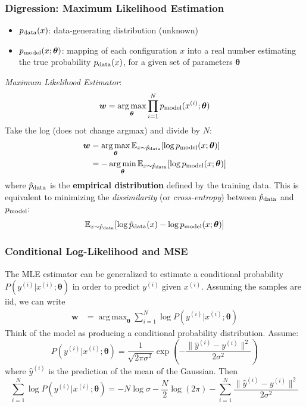 \documentclass{beamer}
\DeclareMathOperator*{\argmax}{arg\,max}
\DeclareMathOperator*{\argmin}{arg\,min}
\begin{document}
		\begin{frame}
		\frametitle{Digression: Maximum Likelihood Estimation}
		\begin{itemize}
			\item $p_{\rm data}(x)$: data-generating distribution (unknown)
			\item $p_{\rm model}(x; \bm{\theta})$: mapping of each configuration $x$ into a real number estimating the true probability $p_{\rm data}(x)$, for a given set of parameters $\bm{\theta}$
		\end{itemize}	
		\vspace{2mm}
		\textit{Maximum Likelihood Estimator}:
		$$ \bm{w} = \argmax_{\bm{\theta}} \prod_{i=1}^{N} p_{\rm model}(x^{(i)}; \bm{\theta}) $$
		Take the log (does not change argmax) and divide by $N$:
		\begin{align*}
			\bm{w} &= \argmax_{\bm{\theta}}\mathbb{E}_{x \sim \hat{p}_{\rm data}} [\log p_{\rm model}(x; \bm{\theta})] \\
			&= -\argmin_{\bm{\theta}}\mathbb{E}_{x \sim \hat{p}_{\rm data}} [\log p_{\rm model}(x; \bm{\theta})]
		\end{align*} 
		where $\hat{p}_{\rm data}$ is the \textbf{empirical distribution} defined by the training data.
		This is equivalent to minimizing the \textit{dissimilarity} (or \textit{cross-entropy}) between $ \hat{p}_{\rm data}$ and $p_{\rm model}$:
		$$ \mathbb{E}_{x \sim \hat{p}_{\rm data}} [\log \hat{p}_{\rm data}(x)-\log p_{\rm model}(x; \bm{\theta})] $$
		\end{frame}
		
		\begin{frame}
			\frametitle{Conditional Log-Likelihood and MSE}
			The MLE estimator can be generalized to estimate a conditional probability $P(y^{(i)} | x^{(i)}; \bm{\theta})$ in order to predict $y^{(i)}$ given $x^{(i)}$. Assuming the samples are iid, we can write
			\begin{align*}
				\bm{w} &= \argmax_{\bm{\theta}}\sum_{i=1}^{N}\log P(y^{(i)} | x^{(i)}; \bm{\theta})
			\end{align*} 
			Think of the model as producing a conditional probability distribution. Assume:
			$$ P(y^{(i)} | x^{(i)}; \bm{\theta}) = \frac{1}{\sqrt{2\pi\sigma^2}} \exp\left(-\frac{\|\hat{y}^{(i)}-y^{(i)}\|^2}{2\sigma^2}\right)$$
			where $\hat{y}^{(i)}$ is the prediction of the mean of the Gaussian. Then
			$$\sum_{i=1}^{N}\log P(y^{(i)} | x^{(i)}; \bm{\theta}) = -N\log \sigma - \frac{N}{2}\log (2\pi) - \sum_{i=1}^{N}\frac{\|\hat{y}^{(i)}-y^{(i)}\|^2}{2\sigma^2}$$
		\end{frame}
		
\end{document}
